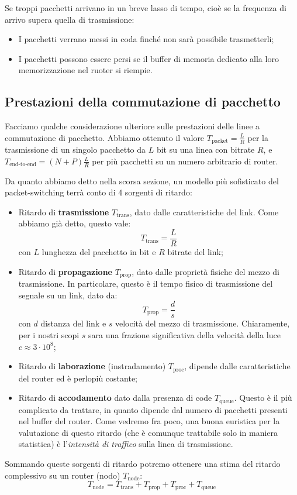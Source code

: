 \documentclass[a4paper,11pt]{article}
\begin{document}
Se troppi pacchetti arrivano in un breve lasso di tempo, cioè se la frequenza di arrivo supera quella di trasmissione:
\begin{itemize}
	\item I pacchetti verrano messi in coda finché non sarà possibile trasmetterli;
	\item I pacchetti possono essere persi se il buffer di memoria dedicato alla loro memorizzazione nel ruoter si riempie.
\end{itemize}

\subsection{Prestazioni della commutazione di pacchetto}
Facciamo qualche considerazione ulteriore sulle prestazioni delle linee a commutazione di pacchetto.
Abbiamo ottenuto il valore $T_{\text{packet}} = \frac{L}{R}$ per la trasmissione di un singolo pacchetto da $L$ bit su una linea con bitrate $R$, e $T_{\text{end-to-end}} = (N + P) \frac{L}{R}$ per più pacchetti su un numero arbitrario di router.

Da quanto abbiamo detto nella scorsa sezione, un modello più sofisticato del packet-switching terrà conto di 4 sorgenti di ritardo:
\begin{itemize}
	\item Ritardo di \textbf{trasmissione} $T_{\text{trans}}$, dato dalle caratteristiche del link. Come abbiamo già detto, questo vale:
		$$
		T_{\text{trans}} = \frac{L}{R}
		$$
		con $L$ lunghezza del pacchetto in bit e $R$ bitrate del link;
	\item Ritardo di \textbf{propagazione} $T_{\text{prop}}$, dato dalle proprietà fisiche del mezzo di trasmissione. In particolare, questo è il tempo fisico di trasmissione del segnale su un link, dato da:
		$$
		T_{\text{prop}} = \frac{d}{s}
		$$
con $d$ distanza del link e $s$ velocità del mezzo di trasmissione. Chiaramente, per i nostri scopi $s$ sara una frazione significativa della velocità della luce $c \approx 3 \cdot 10^8$;
	\item Ritardo di \textbf{laborazione} (instradamento) $T_{\text{proc}}$, dipende dalle caratteristiche del router ed è perlopiù costante;
	\item Ritardo di \textbf{accodamento} dato dalla presenza di code $T_{\text{queue}}$. Questo è il più complicato da trattare, in quanto dipende dal numero di pacchetti presenti nel buffer del router. Come vedremo fra poco, una buona euristica per la valutazione di questo ritardo (che è comunque trattabile solo in maniera statistica) è l'\textit{intensità di traffico} sulla linea di trasmissione.
\end{itemize}
Sommando queste sorgenti di ritardo potremo ottenere una stima del ritardo complessivo su un router (nodo) $T_{\text{node}}$:
$$
T_{\text{node}} = T_{\text{trans}} + T_{\text{prop}} + T_{\text{proc}} + T_{\text{queue}}
$$
\end{document}
